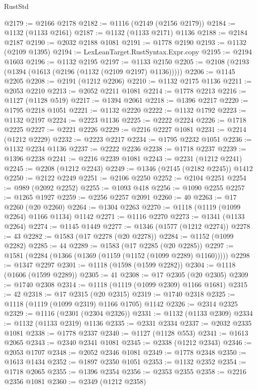 \begin{lexlean}{RustStd}
\begin{coremodule}
@2179 := @2166 @2178
@2182 := @1116 (@2149 (@2156 @2179))
@2184 := @1132 (@1133 @2161)
@2187 := @1132 (@1133 @2171) @1136
@2188 := @2184 @2187
@2190 := @2032 @2188 @1081
@2191 := @1778 @2190
@2193 := @1132 (@2109 @1395)
@2194 := LexLeanTarget.RustSyntax.Expr.copy
@2195 := @2194 @1603
@2196 := @1132 @2195
@2197 := @1133 @2150
@2205 := @2108 (@2193 (@1394 (@1613 (@2196 (@1132 (@2109 @2197) @1136)))))
@2206 := @1145 @2205
@2208 := @2191 (@1212 @2206)
@2210 := @1132 @2175 @1136
@2211 := @2053 @2210
@2213 := @2052 @2211 @1081
@2214 := @1778 @2213
@2216 := @1127 (@1128 @519)
@2217 := @1394 @2061
@2218 := @1396 @2217
@2220 := @1795 @2218 @1051
@2221 := @1132 @2220
@2222 := @1132 @1792
@2223 := @1132 @2197
@2224 := @2223 @1136
@2225 := @2222 @2224
@2226 := @1718 @2225
@2227 := @2221 @2226
@2229 := @2216 @2227 @1081
@2231 := @2214 (@1212 @2229)
@2232 := @2223 @2217
@2234 := @1795 @2232 @1051
@2236 := @1132 @2234 @1136
@2237 := @2222 @2236
@2238 := @1718 @2237
@2239 := @1396 @2238
@2241 := @2216 @2239 @1081
@2243 := @2231 (@1212 @2241)
@2245 := @2208 (@1212 @2243)
@2249 := @1346 (@2145 (@2182 @2245)) @1412
@2250 := @2122 @2249
@2251 := @2106 @2250
@2252 := @2104 @2251
@2254 := @989 (@2092 @2252)
@2255 := @1093 @418
@2256 := @1090 @2255
@2257 := @1265 @1927
@2259 := @2256 @2257 @2091
@2260 := 40
@2263 := @17 @2260 (@20 @2260)
@2264 := @1304 @2263
@2270 := @1118 (@1119 (@1099 @2264) @1166 @1134) @1142
@2271 := @1116 @2270
@2273 := @1341 (@1133 @2264)
@2274 := @1145 @1449
@2277 := @1346 (@1577 (@1212 @2274))
@2278 := 43
@2282 := @1583 (@17 @2278 (@20 @2278))
@2284 := @1152 (@1099 @2282)
@2285 := 44
@2289 := @1583 (@17 @2285 (@20 @2285))
@2297 := @1581 (@2284 (@1366 (@1369 (@1159 (@1152 (@1099 @2289) @1160)))))
@2298 := @1347 @2297
@2301 := @1118 (@1598 (@1599 @2282))
@2304 := @1118 (@1606 (@1599 @2289))
@2305 := 41
@2308 := @17 @2305 (@20 @2305)
@2309 := @1740 @2308
@2314 := @1118 (@1119 (@1099 @2309) @1166 @1681)
@2315 := 42
@2318 := @17 @2315 (@20 @2315)
@2319 := @1740 @2318
@2325 := @1118 (@1119 (@1099 @2319) @1166 @1705) @1142
@2326 := @2314 @2325
@2329 := @1116 (@2301 (@2304 @2326))
@2331 := @1132 (@1133 @2309)
@2334 := @1132 (@1133 @2319) @1136
@2335 := @2331 @2334
@2337 := @2032 @2335 @1081
@2338 := @1778 @2337
@2340 := @1127 (@1128 @553)
@2341 := @1613 @2065
@2343 := @2340 @2341 @1081
@2345 := @2338 (@1212 @2343)
@2346 := @2053 @1707
@2348 := @2052 @2346 @1081
@2349 := @1778 @2348
@2350 := @1613 @1434
@2352 := @1897 @2350 @1051
@2353 := @1132 @2352
@2354 := @1718 @2065
@2355 := @1396 @2354
@2356 := @2353 @2355
@2358 := @2216 @2356 @1081
@2360 := @2349 (@1212 @2358)

\end{coremodule}
\end{lexlean}
